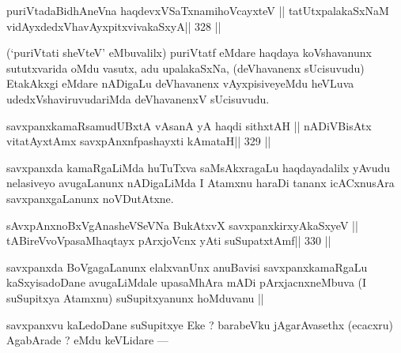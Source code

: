 \begin{shl}
puriVtadaBidhAneVna haqdevxVSaTxnamihoVcayxteV ||
tatUtxpalakaSxNaM vidAyxdedxVhavAyxpitxvivakaSxyA\hfill || 328 ||
\end{shl}

\begin{artha}
(`puriVtati sheVteV' eMbuvalilx) puriVtatf eMdare haqdaya koVshavanunx 
sututxvarida oMdu vasutx, adu upalakaSxNa, (deVhavanenx sUcisuvudu) EtakAkxgi eMdare nADigaLu deVhavanenx vAyxpisiveyeMdu heVLuva udedxVshaviruvudariMda deVhavanenxV sUcisuvudu.
\end{artha}

\begin{shl}
savxpanxkamaRsamudUBxtA vAsanA yA haqdi sithxtAH ||
nADiVBisAtx vitatAyx\s\s tAmx savxpAnxnfpashayxti  kAmataH\hfill || 329 ||
\end{shl}

\begin{artha}
savxpanxda kamaRgaLiMda huTuTxva saMsAkxragaLu haqdayadalilx yAvudu nelasiveyo avugaLanunx nADigaLiMda I Atamxnu haraDi tananx icACxnusAra savxpanxgaLanunx noVDutAtxne.
\end{artha}

\begin{shl}
sAvxpAnxnoBxVgAnasheVSeVNa BukAtxvX savxpanxkirxyAkaSxyeV ||
\footnotemark[6]tABireVvoVpasaMhaqtayx pArxjoVcnx yAti suSupatxtAmf\hfill || 330 ||
\end{shl}

\begin{artha}
savxpanxda BoVgagaLanunx elalxvanUnx anuBavisi savxpanxkamaRgaLu kaSxyisadoDane avugaLiMdale upasaMhAra mADi pArxjacnxneMbuva (I suSupitxya Atamxnu) suSupitxyanunx hoMduvanu ||
\end{artha}

\begin{artha}
savxpanxvu kaLedoDane suSupitxye Eke ? barabeVku jAgarAvasethx (ecacxru) AgabArade ? eMdu keVLidare ---
\end{artha}

